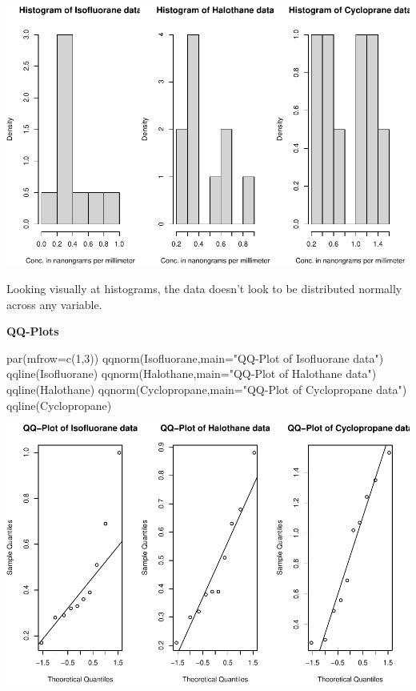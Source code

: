 \documentclass[
]{article}
\newenvironment{Shaded}{\begin{snugshade}}{\end{snugshade}}
\newcommand{\AttributeTok}[1]{\textcolor[rgb]{0.77,0.63,0.00}{#1}}
\newcommand{\DecValTok}[1]{\textcolor[rgb]{0.00,0.00,0.81}{#1}}
\newcommand{\FunctionTok}[1]{\textcolor[rgb]{0.00,0.00,0.00}{#1}}
\newcommand{\NormalTok}[1]{#1}
\newcommand{\StringTok}[1]{\textcolor[rgb]{0.31,0.60,0.02}{#1}}
\begin{document}
\includegraphics{assignment1_group75_final_files/figure-latex/unnamed-chunk-16-1.pdf}

Looking visually at histograms, the data doesn't look to be distributed
normally across any variable.

\textbf{QQ-Plots}

\begin{Shaded}
\begin{Highlighting}[]
\FunctionTok{par}\NormalTok{(}\AttributeTok{mfrow=}\FunctionTok{c}\NormalTok{(}\DecValTok{1}\NormalTok{,}\DecValTok{3}\NormalTok{))}
\FunctionTok{qqnorm}\NormalTok{(Isofluorane,}\AttributeTok{main=}\StringTok{"QQ{-}Plot of Isofluorane data"}\NormalTok{)}
\FunctionTok{qqline}\NormalTok{(Isofluorane)}
\FunctionTok{qqnorm}\NormalTok{(Halothane,}\AttributeTok{main=}\StringTok{"QQ{-}Plot of Halothane data"}\NormalTok{)}
\FunctionTok{qqline}\NormalTok{(Halothane)}
\FunctionTok{qqnorm}\NormalTok{(Cyclopropane,}\AttributeTok{main=}\StringTok{"QQ{-}Plot of Cyclopropane data"}\NormalTok{)}
\FunctionTok{qqline}\NormalTok{(Cyclopropane)}
\end{Highlighting}
\end{Shaded}

\includegraphics{assignment1_group75_final_files/figure-latex/unnamed-chunk-17-1.pdf}
\end{document}
